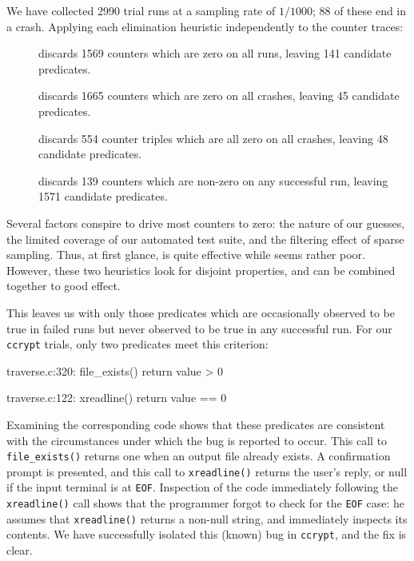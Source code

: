 We have collected 2990 trial runs at a sampling rate of $1/1000$; 88
of these end in a crash.  Applying each elimination heuristic
independently to the counter traces:

\begin{description}
\item[] discards 1569 counters which are
  zero on all runs, leaving 141 candidate predicates.
  
\item[] discards 1665 counters which are
  zero on all crashes, leaving 45 candidate predicates.
  
\item[] discards 554 counter triples
  which are all zero on all crashes, leaving 48 candidate predicates.
  
\item[] discards 139 counters which
  are non-zero on any successful run, leaving 1571 candidate
  predicates.
\end{description}

Several factors conspire to drive most counters to zero: the \naive
nature of our guesses, the limited coverage of our automated test
suite, and the filtering effect of sparse sampling.  Thus, at first
glance,  is quite effective
while  seems rather
poor.  However, these two heuristics look for disjoint properties, and
can be combined together to good effect.

This leaves us with only those predicates which are occasionally
observed to be true in failed runs but never observed to be true in
any successful run.  For our \texttt{ccrypt} trials, only two
predicates meet this criterion:

\begin{features}
\item traverse.c:320: file\_exists() return value > 0
\item traverse.c:122: xreadline() return value == 0
\end{features}

Examining the corresponding code shows that these predicates are
consistent with the circumstances under which the bug is reported to
occur.  This call to \texttt{file\_exists()} returns one when an output
file already exists.  A confirmation prompt is presented, and this
call to \texttt{xreadline()} returns the user's reply, or null if the
input terminal is at \texttt{EOF}.  Inspection of the code immediately
following the \texttt{xreadline()} call shows that the programmer
forgot to check for the \texttt{EOF} case: he assumes that
\texttt{xreadline()} returns a non-null string, and immediately
inspects its contents.  We have successfully isolated this (known) bug
in \texttt{ccrypt}, and the fix is clear.

